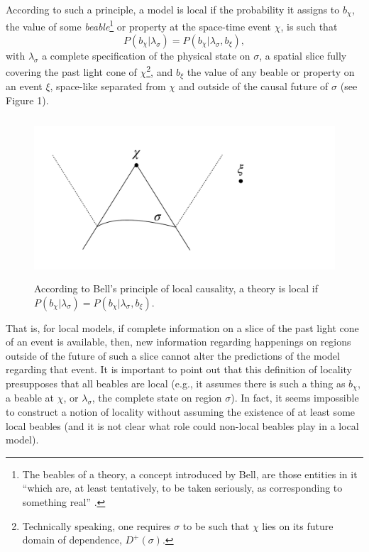 \documentclass[letterpaper,12pt]{article}
\begin{document}
According to such a principle, a model is local if the probability it assigns to $b_\chi$, the value of some \emph{beable}\footnote{The beables of a theory, a concept introduced by Bell, are those entities in it ``which are, at least tentatively, to be taken seriously, as corresponding to something real'' \cite{Bell1990}.} or property at the space-time event $\chi$, is such that
\begin{equation} \label{condprobA}
P(b_\chi|\lambda_\sigma) = P(b_\chi| \lambda_\sigma,b_\xi),
\end{equation} 
with $\lambda_\sigma$ a complete specification of the physical state on $\sigma$, a spatial slice fully covering the past light cone of $\chi$\footnote{Technically speaking, one requires $\sigma$ to be such that $\chi$ lies on its future domain of dependence, $ D^{+}( \sigma) $.}, and $b_\xi$ the value of any beable or property on an event $\xi$, space-like separated from $\chi$ and outside of the causal future of $\sigma$ (see Figure 1).
\begin{figure}[ht]
\centering
\includegraphics[height=6cm]{fig1.pdf} 
\caption{According to Bell's principle of local causality, a theory is local if $P(b_\chi|\lambda_\sigma) = P(b_\chi|\lambda_\sigma,b_\xi)$.}
\end{figure}
That is, for local models, if complete information on a slice of the past light cone of an event is available, then, new information regarding happenings on regions outside of the future of such a slice cannot alter the predictions of the model regarding that event. It is important to point out that this definition of locality presupposes that all beables are local (e.g., it assumes there is such a thing as $b_\chi$, a beable at $\chi$, or $\lambda_\sigma$, the complete state on region $\sigma$). In fact, it seems impossible to construct a notion of locality without assuming the existence of at least some local beables (and it is not clear what role could non-local beables play in a local model).
\end{document}
